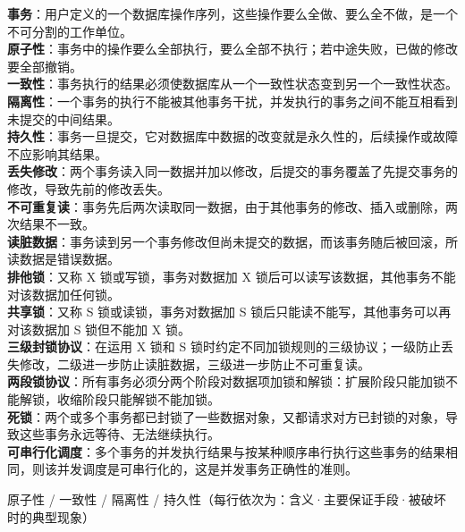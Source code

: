 \documentclass[a4paper,11pt]{article}
\begin{document}
\begin{keyterms}
\textbf{事务}：用户定义的一个数据库操作序列，这些操作要么全做、要么全不做，是一个不可分割的工作单位。\\
\textbf{原子性}：事务中的操作要么全部执行，要么全部不执行；若中途失败，已做的修改要全部撤销。\\
\textbf{一致性}：事务执行的结果必须使数据库从一个一致性状态变到另一个一致性状态。\\
\textbf{隔离性}：一个事务的执行不能被其他事务干扰，并发执行的事务之间不能互相看到未提交的中间结果。\\
\textbf{持久性}：事务一旦提交，它对数据库中数据的改变就是永久性的，后续操作或故障不应影响其结果。\\
\textbf{丢失修改}：两个事务读入同一数据并加以修改，后提交的事务覆盖了先提交事务的修改，导致先前的修改丢失。\\
\textbf{不可重复读}：事务先后两次读取同一数据，由于其他事务的修改、插入或删除，两次结果不一致。\\
\textbf{读脏数据}：事务读到另一个事务修改但尚未提交的数据，而该事务随后被回滚，所读数据是错误数据。\\
\textbf{排他锁}：又称 X 锁或写锁，事务对数据加 X 锁后可以读写该数据，其他事务不能对该数据加任何锁。\\
\textbf{共享锁}：又称 S 锁或读锁，事务对数据加 S 锁后只能读不能写，其他事务可以再对该数据加 S 锁但不能加 X 锁。\\
\textbf{三级封锁协议}：在运用 X 锁和 S 锁时约定不同加锁规则的三级协议；一级防止丢失修改，二级进一步防止读脏数据，三级进一步防止不可重复读。\\
\textbf{两段锁协议}：所有事务必须分两个阶段对数据项加锁和解锁：扩展阶段只能加锁不能解锁，收缩阶段只能解锁不能加锁。\\
\textbf{死锁}：两个或多个事务都已封锁了一些数据对象，又都请求对方已封锁的对象，导致这些事务永远等待、无法继续执行。\\
\textbf{可串行化调度}：多个事务的并发执行结果与按某种顺序串行执行这些事务的结果相同，则该并发调度是可串行化的，这是并发事务正确性的准则。
\end{keyterms}

\begin{contrast}{原子性 / 一致性 / 隔离性 / 持久性（每行依次为：含义·主要保证手段·被破坏时的典型现象）}
\end{contrast}
\end{document}
